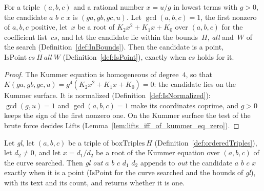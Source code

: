 \begin{lemma}\label{lem:isPoint_pointOfRoot_iff}
  \leanok
  For a triple $(a, b, c)$ and a rational number $x = u/g$ in lowest terms with $g > 0$, the
  candidate  $a$ $b$ $c$ $x$ is $(ga, gb, gc, u)$. Let $\gcd(a, b, c) =
  1$, the first nonzero of $a, b, c$ positive, let~$x$ be a root of $K_2x^2 + K_1x + K_0$ over $(a,
  b, c)$ for the coefficient list~$cs$, and let the candidate lie within the bounds~$H$,
  \textit{all} and~$W$ of the search (Definition~\ref{def:InBounds}). Then the candidate is a point,
  $\mathrm{IsPoint}\ cs\ H\ \mathit{all}\ W$ (Definition~\ref{def:IsPoint}), exactly when
   $cs$ holds for it.
\end{lemma}

\begin{proof}
  \leanok
  The Kummer equation is homogeneous of degree~$4$, so that $K(ga, gb, gc, u) = g^4 (K_2x^2 + K_1x
  + K_0) = 0$: the candidate lies on the Kummer surface. It is normalized
  (Definition~\ref{def:IsNormalized}): $\gcd(g, u) = 1$ and $\gcd(a, b, c) = 1$ make its
  coordinates coprime, and $g > 0$ keeps the sign of the first nonzero one. On the Kummer surface
  the test of the brute force decides $\mathrm{Lifts}$
  (Lemma~\ref{lem:lifts_iff_of_kummer_eq_zero}).
\end{proof}

\begin{lemma}\label{lem:checkOnePointFinal_spec}
  \leanok
  Let  \textit{gl}, let $(a, b, c)$ be a triple of
  $\mathrm{boxTriples}\ H$ (Definition~\ref{def:orderedTriples}), let $d_2 \ne 0$, and let $x =
  d_1/d_2$ be a root of the Kummer equation over $(a, b, c)$ of the curve searched. Then
   \textit{gl} \textit{out} $a$ $b$ $c$ $d_1$ $d_2$ appends to
  \textit{out} the candidate  $a$ $b$ $c$ $x$ exactly when it is a point
  ($\mathrm{IsPoint}$ for the curve searched and the bounds of \textit{gl}), with its text and its
  count, and returns whether it is one.
\end{lemma}

